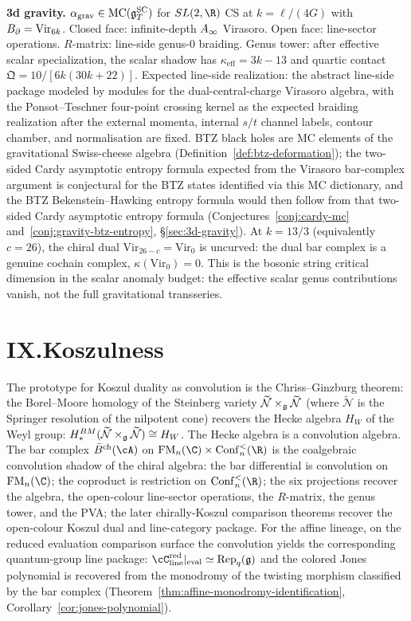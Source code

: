 \medskip
\noindent\textbf{3d gravity.}\enspace
$\alpha_{\mathrm{grav}} \in \operatorname{MC}(\mathfrak{g}^{\mathrm{SC}}_T)$ for $SL(2,\R)$ CS at
$k = \ell/(4G)$ with $B_{\partial} = \mathrm{Vir}_{6k}$. Closed face:
infinite-depth $A_\infty$ Virasoro. Open face:
line-sector operations. $R$-matrix: line-side genus-$0$ braiding.
Genus tower: after effective scalar specialization, the scalar shadow
has $\kappa_{\mathrm{eff}} = 3k-13$ and quartic contact
$\mathfrak{Q} = 10/[6k(30k+22)]$. Expected line-side realization:
the abstract line-side package modeled by modules for the
dual-central-charge Virasoro algebra, with the Ponsot--Teschner
four-point crossing kernel as the expected braiding realization after
the external momenta, internal $s/t$ channel labels, contour chamber,
and normalisation are fixed.
BTZ black holes are MC elements of the gravitational
Swiss-cheese algebra (Definition~\ref{def:btz-deformation}); the
two-sided Cardy asymptotic entropy formula expected from the
Virasoro bar-complex argument is conjectural for the BTZ states identified via
this MC dictionary, and the BTZ
Bekenstein--Hawking entropy formula would then follow from that
two-sided Cardy asymptotic entropy formula
(Conjectures~\ref{conj:cardy-mc} and~\ref{conj:gravity-btz-entropy},
\S\ref{sec:3d-gravity}).
At $k = 13/3$ (equivalently $c = 26$), the chiral dual
$\mathrm{Vir}_{26-c} = \mathrm{Vir}_0$ is uncurved: the dual bar
complex is a genuine cochain complex, $\kappa(\mathrm{Vir}_0) = 0$.
This is the bosonic string critical dimension in the scalar anomaly
budget: the effective scalar genus contributions vanish, not the full
gravitational transseries.


\section*{IX.\quad Koszulness}

The prototype for Koszul duality as convolution is the Chriss--Ginzburg theorem: the Borel--Moore homology of the Steinberg variety $\widetilde{\mathcal{N}} \times_{\mathfrak{g}} \widetilde{\mathcal{N}}$ (where $\widetilde{\mathcal{N}}$ is the Springer resolution of the nilpotent cone) recovers the Hecke algebra $H_W$ of the Weyl group:
$H_*^{BM}(\widetilde{\mathcal{N}} \times_{\mathfrak{g}}
\widetilde{\mathcal{N}}) \cong H_W$. The Hecke algebra is
a convolution algebra. The bar complex $\barBch(\cA)$ on
$\FM_n(\C) \times \Conf_n^{<}(\R)$ is the coalgebraic convolution
shadow of the chiral algebra: the bar differential is convolution on
$\FM_n(\C)$; the coproduct is restriction on $\Conf_n^{<}(\R)$;
the six projections recover the algebra, the open-colour
line-sector operations, the $R$-matrix, the genus tower, and the
PVA\@; the later chirally-Koszul comparison theorems recover the
open-colour Koszul dual and line-category package.
For the affine lineage, on the reduced evaluation comparison surface
the convolution yields the corresponding quantum-group line package:
$\cC_{\mathrm{line}}^{\mathrm{red}}|_{\mathrm{eval}} \simeq
\mathrm{Rep}_q(\fg)$ and the colored Jones
polynomial is recovered from the monodromy of the twisting morphism classified by the bar complex (Theorem~\ref{thm:affine-monodromy-identification},
Corollary~\ref{cor:jones-polynomial}).


